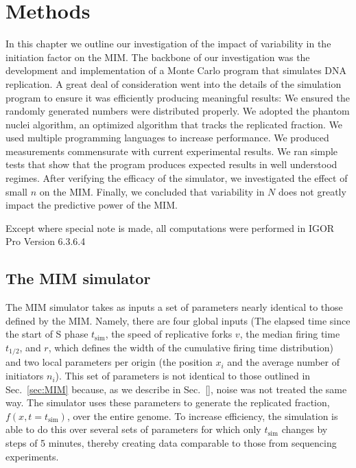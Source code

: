 \chapter{Methods}
\label{ch:Methods}

In this chapter we outline our investigation of the impact of variability in the initiation factor on the MIM.
The backbone of our investigation was the development and implementation of a Monte Carlo program that simulates DNA replication.
A great deal of consideration went into the details of the simulation program to ensure it was efficiently producing meaningful results:
We ensured the randomly generated numbers were distributed properly.
We adopted the phantom nuclei algorithm, an optimized algorithm that tracks the replicated fraction.
We used multiple programming languages to increase performance.
We produced measurements commensurate with current experimental results.
We ran simple tests that show that the program produces expected results in well understood regimes.
After verifying the efficacy of the simulator, we investigated the effect of small $n$ on the MIM.
Finally, we concluded that variability in $N$ does not greatly impact the predictive power of the MIM.

Except where special note is made, all computations were performed in IGOR Pro Version 6.3.6.4


	\section{The MIM simulator}
	\label{sec:MIMSimulator}
	
	The MIM simulator takes as inputs a set of parameters nearly identical to those defined by the MIM.
	Namely, there are four global inputs (The elapsed time since the start of S phase $t_\text{sim}$, the speed of replicative forks $v$, the median firing time $t_{1/2}$, and $r$, which defines the width of the cumulative firing time distribution) and two local parameters per origin (the position $x_i$ and the average number of initiators $n_i$).
	This set of parameters is not identical to those outlined in Sec.~\ref{sec:MIM} because, as we describe in Sec.~\ref{}, noise was not treated the same way.
	The simulator uses these parameters to generate the replicated fraction, $f(x,t=t_\text{sim})$, over the entire genome.
	To increase efficiency, the simulation is able to do this over several sets of parameters for which only $t_\text{sim}$ changes by steps of 5 minutes, thereby creating data comparable to those from sequencing experiments.
	
